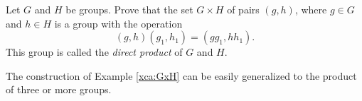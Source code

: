 \begin{exercise}
\label{xca:GxH}
        Let $G$ and $H$ be groups. Prove that 
        the set 
        $G\times H$
        of pairs $(g,h)$, where $g\in G$ and 
        $h\in H$ is a group with
        the operation
        \[
                (g,h)(g_1,h_1)=(gg_1,hh_1).
        \]
        This group is called the 
        \emph{direct product} of $G$ and $H$.
\end{exercise}

The construction of Example \ref{xca:GxH}
can be easily generalized to the product of 
three or more groups. 

